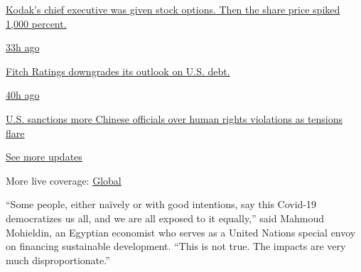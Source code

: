 \href{https://www.nytimes.com/live/2020/07/31/business/stock-market-today-coronavirus?action=click\&pgtype=Article\&state=default\&region=MAIN_CONTENT_1\&context=storylines_live_updates\#kodaks-chief-executive-was-given-stock-options-then-the-share-price-spiked-1000-percent}{Kodak's
chief executive was given stock options. Then the share price spiked
1,000 percent.}

\href{https://www.nytimes.com/live/2020/07/31/business/stock-market-today-coronavirus?action=click\&pgtype=Article\&state=default\&region=MAIN_CONTENT_1\&context=storylines_live_updates\#fitch-ratings-downgrades-its-outlook-on-us-debt}{33h
ago}

\href{https://www.nytimes.com/live/2020/07/31/business/stock-market-today-coronavirus?action=click\&pgtype=Article\&state=default\&region=MAIN_CONTENT_1\&context=storylines_live_updates\#fitch-ratings-downgrades-its-outlook-on-us-debt}{Fitch
Ratings downgrades its outlook on U.S. debt.}

\href{https://www.nytimes.com/live/2020/07/31/business/stock-market-today-coronavirus?action=click\&pgtype=Article\&state=default\&region=MAIN_CONTENT_1\&context=storylines_live_updates\#us-sanctions-more-chinese-officials-over-human-rights-violations-as-tensions-flare}{40h
ago}

\href{https://www.nytimes.com/live/2020/07/31/business/stock-market-today-coronavirus?action=click\&pgtype=Article\&state=default\&region=MAIN_CONTENT_1\&context=storylines_live_updates\#us-sanctions-more-chinese-officials-over-human-rights-violations-as-tensions-flare}{U.S.
sanctions more Chinese officials over human rights violations as
tensions flare}

\href{https://www.nytimes.com/live/2020/07/31/business/stock-market-today-coronavirus?action=click\&pgtype=Article\&state=default\&region=MAIN_CONTENT_1\&context=storylines_live_updates}{See
more updates}

More live coverage:
\href{https://www.nytimes.com/2020/08/01/world/coronavirus-covid-19.html?action=click\&pgtype=Article\&state=default\&region=MAIN_CONTENT_1\&context=storylines_live_updates}{Global}

``Some people, either naïvely or with good intentions, say this Covid-19
democratizes us all, and we are all exposed to it equally,'' said
Mahmoud Mohieldin, an Egyptian economist who serves as a United Nations
special envoy on financing sustainable development. ``This is not true.
The impacts are very much disproportionate.''

